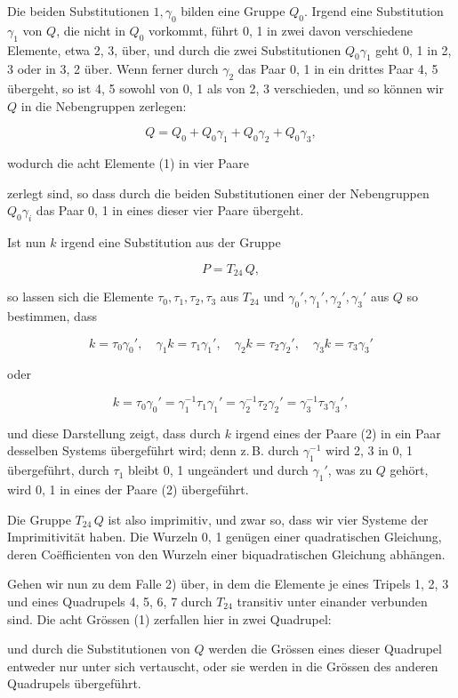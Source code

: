Die beiden Substitutionen $1, \gamma_0$ bilden eine Gruppe $Q_0$. Irgend eine Substitution $\gamma_1$ von $Q$, die nicht in $Q_0$ vorkommt, führt 0, 1 in zwei davon verschiedene Elemente, etwa 2, 3, über, und durch die zwei Substitutionen $Q_0\gamma_1$ geht 0, 1 in 2, 3 oder in 3, 2 über. Wenn ferner durch $\gamma_2$ das Paar 0, 1 in ein drittes Paar 4, 5 übergeht, so ist 4, 5 sowohl von 0, 1 als von 2, 3 verschieden, und so können wir $Q$ in die Nebengruppen zerlegen:

\[
Q = Q_0 + Q_0\gamma_1 + Q_0\gamma_2 + Q_0\gamma_3,
\]

wodurch die acht Elemente (1) in vier Paare


zerlegt sind, so dass durch die beiden Substitutionen einer der Nebengruppen $Q_0\gamma_i$ das Paar 0, 1 in eines dieser vier Paare übergeht.

Ist nun $k$ irgend eine Substitution aus der Gruppe

\[
P = T_{24}\,Q,
\]

so lassen sich die Elemente $\tau_0, \tau_1, \tau_2, \tau_3$ aus $T_{24}$ und $\gamma_0', \gamma_1', \gamma_2', \gamma_3'$ aus $Q$ so bestimmen, dass

\[
k = \tau_0\gamma_0', \quad \gamma_1 k = \tau_1\gamma_1', \quad \gamma_2 k = \tau_2\gamma_2', \quad \gamma_3 k = \tau_3\gamma_3'
\]

oder

\[
k = \tau_0\gamma_0' = \gamma_1^{-1}\tau_1\gamma_1' = \gamma_2^{-1}\tau_2\gamma_2' = \gamma_3^{-1}\tau_3\gamma_3',
\]

und diese Darstellung zeigt, dass durch $k$ irgend eines der Paare (2) in ein Paar desselben Systems übergeführt wird; denn z.\,B. durch $\gamma_1^{-1}$ wird 2, 3 in 0, 1 übergeführt, durch $\tau_1$ bleibt 0, 1 ungeändert und durch $\gamma_1'$, was zu $Q$ gehört, wird 0, 1 in eines der Paare (2) übergeführt.

Die Gruppe $T_{24}\,Q$ ist also imprimitiv, und zwar so, dass wir vier Systeme der Imprimitivität haben. Die Wurzeln 0, 1 genügen einer quadratischen Gleichung, deren Coëfficienten von den Wurzeln einer biquadratischen Gleichung abhängen.

Gehen wir nun zu dem Falle 2) über, in dem die Elemente je eines Tripels 1, 2, 3 und eines Quadrupels 4, 5, 6, 7 durch $T_{24}$ transitiv unter einander verbunden sind. Die acht Grössen (1) zerfallen hier in zwei Quadrupel:


und durch die Substitutionen von $Q$ werden die Grössen eines dieser Quadrupel entweder nur unter sich vertauscht, oder sie werden in die Grössen des anderen Quadrupels übergeführt.
